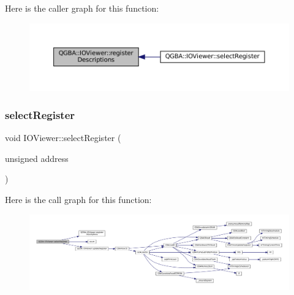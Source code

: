 Here is the caller graph for this function\+:
\nopagebreak
\begin{figure}[H]
\begin{center}
\leavevmode
\includegraphics[width=350pt]{class_q_g_b_a_1_1_i_o_viewer_aa3556b84da7a172cacd46b3582d1bfa5_icgraph}
\end{center}
\end{figure}
\mbox{\label{class_q_g_b_a_1_1_i_o_viewer_a7ea54cf288ddfc8246a3c41681114b8d}} 
\subsubsection{\texorpdfstring{select\+Register}{selectRegister}\hspace{0.1cm}{\footnotesize\ttfamily [1/2]}}
{\footnotesize\ttfamily void I\+O\+Viewer\+::select\+Register (\begin{DoxyParamCaption}\item[{unsigned}]{address }\end{DoxyParamCaption})\hspace{0.3cm}{\ttfamily [slot]}}

Here is the call graph for this function\+:
\nopagebreak
\begin{figure}[H]
\begin{center}
\leavevmode
\includegraphics[width=350pt]{class_q_g_b_a_1_1_i_o_viewer_a7ea54cf288ddfc8246a3c41681114b8d_cgraph}
\end{center}
\end{figure}
\mbox{\label{class_q_g_b_a_1_1_i_o_viewer_a57f7fdec26467658e8bb78628fff66dc}} 
